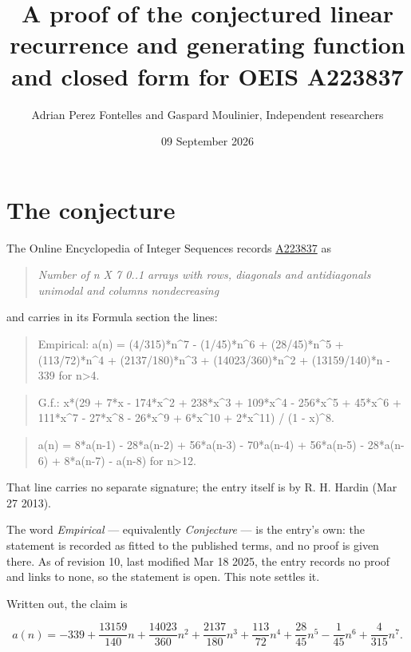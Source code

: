 \documentclass[11pt]{article}
\title{A proof of the conjectured linear recurrence and generating function and closed form for OEIS A223837}
\author{Adrian Perez Fontelles and Gaspard Moulinier, Independent researchers}
\date{09 September 2026}
\theoremstyle{definition}
\begin{document}
\maketitle
\section{The conjecture}

The Online Encyclopedia of Integer Sequences records \href{https://oeis.org/A223837}{A223837} as

\begin{quote}\itshape Number of n X 7 0..1 arrays with rows, diagonals and antidiagonals unimodal and columns nondecreasing\end{quote}

and carries in its Formula section the lines:

\begin{quote}\ttfamily Empirical: a(n) = (4/315)*n\textasciicircum{}7 - (1/45)*n\textasciicircum{}6 + (28/45)*n\textasciicircum{}5 + (113/72)*n\textasciicircum{}4 + (2137/180)*n\textasciicircum{}3 + (14023/360)*n\textasciicircum{}2 + (13159/140)*n - 339 for n>4.\end{quote}

\begin{quote}\ttfamily G.f.: x*(29 + 7*x - 174*x\textasciicircum{}2 + 238*x\textasciicircum{}3 + 109*x\textasciicircum{}4 - 256*x\textasciicircum{}5 + 45*x\textasciicircum{}6 + 111*x\textasciicircum{}7 - 27*x\textasciicircum{}8 - 26*x\textasciicircum{}9 + 6*x\textasciicircum{}10 + 2*x\textasciicircum{}11) / (1 - x)\textasciicircum{}8.\end{quote}

\begin{quote}\ttfamily a(n) = 8*a(n-1) - 28*a(n-2) + 56*a(n-3) - 70*a(n-4) + 56*a(n-5) - 28*a(n-6) + 8*a(n-7) - a(n-8) for n>12.\end{quote}

That line carries no separate signature; the entry itself is by R. H. Hardin (Mar 27 2013).

The word {\itshape Empirical} --- equivalently {\itshape Conjecture} --- is the entry's own: the statement is recorded as fitted to the published terms, and no proof is given there. As of revision 10, last modified Mar 18 2025, the entry records no proof and links to none, so the statement is open. This note settles it.

Written out, the claim is

\[a(n) = -339 + \frac{13159}{140}n + \frac{14023}{360}n^{2} + \frac{2137}{180}n^{3} + \frac{113}{72}n^{4} + \frac{28}{45}n^{5} - \frac{1}{45}n^{6} + \frac{4}{315}n^{7}.\]
\end{document}
